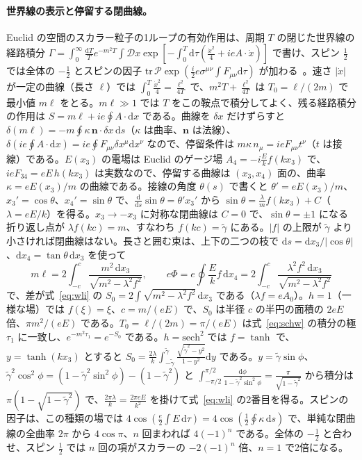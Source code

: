 \documentclass[a4paper,10pt]{ltjsarticle}
\newcommand{\dd}{\mathrm{d}}
\begin{document}
\paragraph{世界線の表示と停留する閉曲線。}Euclid の空間のスカラー粒子の1ループの有効作用は、周期 $T$ の閉じた世界線の経路積分 $\Gamma=\int_0^\infty\frac{\dd T}{T}e^{-m^2T}\int\mathcal Dx\exp[-\int_0^T\dd\tau(\frac{\dot x^2}{4}+ieA\cdot\dot x)]$ で書け、スピン $\frac12$ では全体の $-\frac12$ とスピンの因子 $\mathrm{tr}\,\mathcal P\exp(\frac i2e\sigma^{\mu\nu}\int F_{\mu\nu}\dd\tau)$ が加わる~\cite{ds05}。速さ $|\dot x|$ が一定の曲線（長さ $\ell$）では $\int_0^T\frac{\dot x^2}{4}=\frac{\ell^2}{4T}$ で、$m^2T+\frac{\ell^2}{4T}$ は $T_0=\ell/(2m)$ で最小値 $m\ell$ をとる。$m\ell\gg1$ では $T$ をこの鞍点で積分してよく、残る経路積分の作用は $S=m\ell+ie\oint A\cdot\dd x$ である。曲線を $\delta x$ だけずらすと $\delta(m\ell)=-m\oint\kappa\,\boldsymbol n\cdot\delta x\,\dd s$（$\kappa$ は曲率、$\boldsymbol n$ は法線）、$\delta(ie\oint A\cdot\dd x)=ie\oint F_{\mu\nu}\delta x^\mu\dd x^\nu$ なので、停留条件は $m\kappa\,n_\mu=ieF_{\mu\nu}t^\nu$（$t$ は接線）である。$E(x_3)$ の電場は Euclid のゲージ場 $A_4=-i\frac Ek f(kx_3)$ で、$ieF_{34}=eE\,h(kx_3)$ は実数なので、停留する曲線は $(x_3,x_4)$ 面の、曲率 $\kappa=eE(x_3)/m$ の曲線である。接線の角度 $\theta(s)$ で書くと $\theta'=eE(x_3)/m$、$x_3'=\cos\theta$、$x_4'=\sin\theta$ で、$\frac{\dd}{\dd s}\sin\theta=\theta'x_3'$ から $\sin\theta=\frac{\lambda}{m}f(kx_3)+C$（$\lambda=eE/k$）を得る。$x_3\to-x_3$ に対称な閉曲線は $C=0$ で、$\sin\theta=\pm1$ になる折り返し点が $\lambda f(kc)=m$、すなわち $f(kc)=\tilde\gamma$ にある。$|f|$ の上限が $\tilde\gamma$ より小さければ閉曲線はない。長さと囲む束は、上下の二つの枝で $\dd s=\dd x_3/|\cos\theta|$、$\dd x_4=\tan\theta\,\dd x_3$ を使って
\begin{equation*}
m\ell=2\int_{-c}^{c}\frac{m^2\,\dd x_3}{\sqrt{m^2-\lambda^2f^2}},\qquad e\Phi=e\oint\frac Ekf\,\dd x_4=2\int_{-c}^{c}\frac{\lambda^2f^2\,\dd x_3}{\sqrt{m^2-\lambda^2f^2}}
\end{equation*}
で、差が式~\eqref{eq:wli} の $S_0=2\int\sqrt{m^2-\lambda^2f^2}\,\dd x_3$ である（$\lambda f=eA_0$）。$h=1$（一様な場）では $f(\xi)=\xi$、$c=m/(eE)$ で、$S_0$ は半径 $c$ の半円の面積の $2eE$ 倍、$\pi m^2/(eE)$ である。$T_0=\ell/(2m)=\pi/(eE)$ は式~\eqref{eq:schw} の積分の極 $\tau_1$ に一致し、$e^{-m^2\tau_1}=e^{-S_0}$ である。$h=\mathrm{sech}^2$ では $f=\tanh$ で、$y=\tanh(kx_3)$ とすると $S_0=\frac{2\lambda}{k}\int_{-\tilde\gamma}^{\tilde\gamma}\frac{\sqrt{\tilde\gamma^2-y^2}}{1-y^2}\dd y$ である。$y=\tilde\gamma\sin\phi$、$\tilde\gamma^2\cos^2\phi=(1-\tilde\gamma^2\sin^2\phi)-(1-\tilde\gamma^2)$ と $\int_{-\pi/2}^{\pi/2}\frac{\dd\phi}{1-\tilde\gamma^2\sin^2\phi}=\frac{\pi}{\sqrt{1-\tilde\gamma^2}}$ から積分は $\pi(1-\sqrt{1-\tilde\gamma^2})$ で、$\frac{2\pi\lambda}{k}=\frac{2\pi eE}{k^2}$ を掛けて式~\eqref{eq:wli} の2番目を得る。スピンの因子は、この種類の場では $4\cos(\frac e2\int E\,\dd\tau)=4\cos(\frac12\oint\kappa\,\dd s)$ で、単純な閉曲線の全曲率 $2\pi$ から $4\cos\pi$、$n$ 回まわれば $4(-1)^n$ である。全体の $-\frac12$ と合わせ、スピン $\frac12$ では $n$ 回の項がスカラーの $-2(-1)^n$ 倍、$n=1$ で2倍になる。
\end{document}
